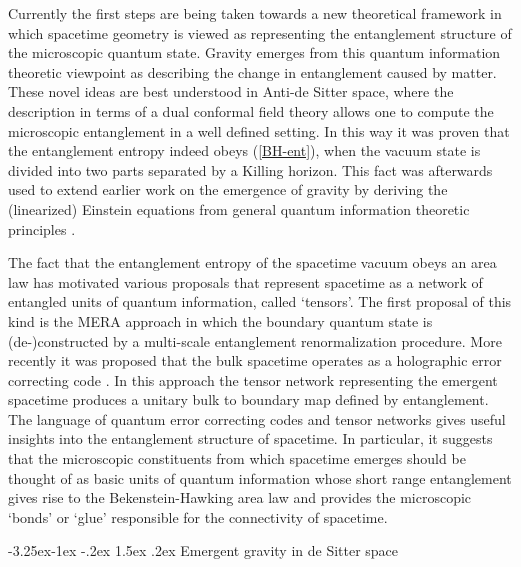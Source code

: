 \documentclass[a4paper,12pt]{article}
\makeatletter
\renewcommand\subsection{\@startsection{subsection}{2}{\z@}%
                                     {-3.25ex\@plus -1ex \@minus -.2ex}%
                                     {1.5ex \@plus .2ex}%
                                     {\normalfont\bfseries}}
\makeatother
\begin{document}
Currently the first steps are being taken towards a new theoretical framework 
in which spacetime geometry is viewed as representing the entanglement 
structure of the microscopic quantum state. Gravity emerges from 
this quantum information theoretic viewpoint as describing the change in  
entanglement caused by matter. These novel ideas are best understood in Anti-de Sitter space,
where the description in terms of a dual conformal field theory allows one to 
compute the microscopic entanglement in a well 
defined setting. In this way it was proven \cite{CasiniMyers, 
MaldaLewko} that the entanglement entropy indeed obeys (\ref{BH-ent}), when the vacuum state is divided into two parts separated by a 
Killing horizon. This fact was afterwards used to extend earlier work on the emergence of gravity \cite{Jacobson, Padma,MyNewtonPaper} by deriving the (linearized) Einstein equations from general quantum information theoretic principles \cite{Raamsdonketal, Swingle-vR, Jacobson2}.  


The fact that the entanglement entropy of the spacetime 
 vacuum obeys an area law has motivated various proposals that represent spacetime 
 as a network of entangled units of quantum information, called `tensors'. The 
first proposal of this kind is the MERA approach 
\cite{MERA, Swingle-Mera} in which the boundary quantum state is (de-)constructed 
by a multi-scale entanglement renormalization procedure. More recently it was proposed that the bulk spacetime operates as a holographic error correcting code 
\cite{HarlowPreskill, Haydenetal}. In this approach the tensor network representing the emergent spacetime produces a unitary bulk to boundary map defined by entanglement.  The language of quantum error correcting codes and tensor networks gives useful insights into the entanglement structure of spacetime. In particular, it suggests that the microscopic constituents from which spacetime emerges should be thought of as basic units of quantum information whose short range entanglement gives rise to the Bekenstein-Hawking area law and provides the microscopic `bonds' or `glue' responsible for the connectivity of spacetime.  %


\subsection{Emergent gravity in de Sitter space}
\end{document}
